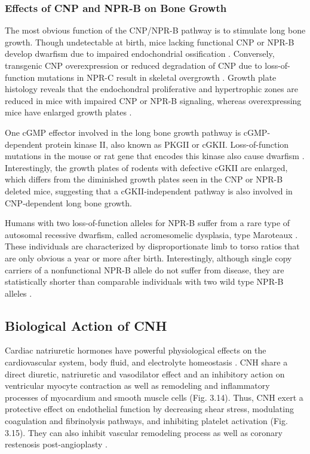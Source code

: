 \documentclass[14pt,a4paper,onecolumn]{extarticle}
\begin{document}
\subsubsection{Effects of CNP and NPR-B on Bone Growth}
The most obvious function of the CNP/NPR-B pathway is to stimulate long bone growth. Though undetectable at birth, mice lacking functional CNP or NPR-B develop dwarfism due to impaired endochondrial ossification \citep{Chusho2001} \citep{Tamura2001} \citep{Tsuji2005}.
Conversely, transgenic CNP overexpression or reduced degradation of CNP due to loss-of-function mutations in NPR-C result in skeletal overgrowth \citep{Yasoda2004}. Growth plate histology reveals that the endochondral proliferative and hypertrophic zones are reduced in mice with impaired CNP or NPR-B signaling, whereas overexpressing mice have enlarged growth plates \citep{Chusho2001} \citep{Tamura2004} \citep{Yasoda2004}.

One cGMP effector involved in the long bone growth pathway is cGMP-dependent protein kinase II, also known as PKGII or cGKII. Loss-of-function mutations in the mouse or rat gene that encodes this kinase also cause dwarfism \citep{Chikuda2004} \citep{Pfeifer1996}. Interestingly, the growth plates of rodents with defective cGKII are enlarged, which differs from the diminished growth plates seen in the CNP or NPR-B deleted mice, suggesting that a cGKII-independent pathway is also involved in CNP-dependent long bone growth.

Humans with two loss-of-function alleles for NPR-B suffer from a rare type of autosomal recessive dwarfism, called acromesomelic dysplasia, type Maroteaux \citep{Bartels2004}. These individuals are characterized by disproportionate limb to torso ratios that are only obvious a year or more after birth. Interestingly, although single copy carriers of a nonfunctional NPR-B allele do not suffer from disease, they are statistically shorter than comparable individuals with two wild type NPR-B alleles \citep{Olney2006}. %

\subsection{Biological Action of CNH }

Cardiac natriuretic hormones have powerful physiological effects on the cardiovascular system, body fluid, and electrolyte homeostasis \citep{13} \citep{28} \citep{30} \citep{77} \citep{78}. CNH share a direct diuretic, natriuretic and vasodilator effect and an inhibitory action on ventricular myocyte contraction \citep{79} as well as remodeling and inflammatory processes of myocardium and smooth muscle cells \citep{80} \citep{81} \citep{82} \citep{83} (Fig. 3.14). Thus, CNH exert a protective effect on endothelial function by decreasing shear stress, modulating coagulation and fibrinolysis pathways, and inhibiting platelet activation (Fig. 3.15). They can also inhibit vascular remodeling process as well as coronary restenosis post-angioplasty \citep{56} \citep{84} \citep{85} \citep{86} \citep{87} \citep{88} \citep{89}.
\end{document}
